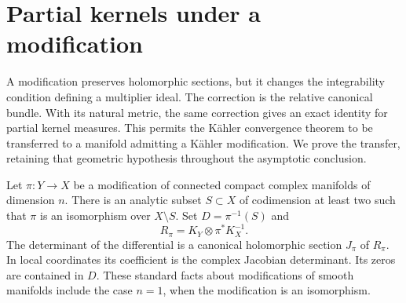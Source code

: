\section{Partial kernels under a modification}
\label{sec:birational-partial-kernels}

A modification preserves holomorphic sections, but it changes the integrability condition defining a multiplier ideal. The correction is the relative canonical bundle. With its natural metric, the same correction gives an exact identity for partial kernel measures. This permits the K\"ahler convergence theorem to be transferred to a manifold admitting a K\"ahler modification. We prove the transfer, retaining that geometric hypothesis throughout the asymptotic conclusion.

Let $\pi:Y\to X$ be a modification of connected compact complex manifolds of dimension $n$. There is an analytic subset $S\subset X$ of codimension at least two such that $\pi$ is an isomorphism over $X\setminus S$. Set $D=\pi^{-1}(S)$ and
\[
 R_\pi=K_Y\otimes\pi^*K_X^{-1}.
\]
The determinant of the differential is a canonical holomorphic section $J_\pi$ of $R_\pi$. In local coordinates its coefficient is the complex Jacobian determinant. Its zeros are contained in $D$. These standard facts about modifications of smooth manifolds include the case $n=1$, when the modification is an isomorphism.

